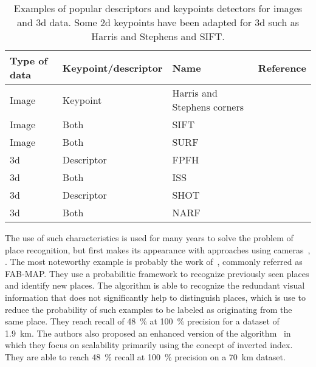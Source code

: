 \begin{table}[H]
    \centering
    \begin{tabular}{@{}llll@{}}
        \toprule
        \textbf{Type of data}  & \textbf{Keypoint/descriptor} & \textbf{Name}               & \textbf{Reference} \\
        \hline
        Image                  & Keypoint                     & Harris and Stephens corners & \cite{Harris1988}  \\
        Image                  & Both                         & SIFT                        & \cite{Lowe2004}    \\
        Image                  & Both                         & SURF                        & \cite{Bay2006}     \\
        \gls*{3d}              & Descriptor                   & FPFH                        & \cite{Rusu2009}    \\
        \gls*{3d}              & Both                         & ISS                         & \cite{Yu2009}      \\
        \gls*{3d}              & Descriptor                   & SHOT                        & \cite{Tombari2010} \\
        \gls*{3d}              & Both                         & NARF                        & \cite{Steder2011a} \\
        \bottomrule
    \end{tabular}
    \caption[Examples of popular descriptors and keypoints detectors for images and \gls*{3d} data.]{Examples of popular descriptors and keypoints detectors for images and \gls*{3d} data. Some \gls*{2d} keypoints have been adapted for \gls*{3d} such as Harris and Stephens and SIFT.}
    \label{tab:features_examples}
\end{table}

The use of such characteristics is used for many years to solve the problem of place recognition, but first makes its appearance with approaches using cameras~\citep{Torralba2003}, \cite{Ulrich2000}. The most noteworthy example is probably the work of~\citet{Cummins2008}, commonly referred as FAB-MAP. They use a probabilitic framework to recognize previously seen places and identify new places. The algorithm is able to recognize the redundant visual information that does not significantly help to distinguish places, which is use to reduce the probability of such examples to be labeled as originating from the same place. They reach recall of \SI{48}{\percent} at \SI{100}{\percent} precision for a dataset of \SI{1.9}{\kilo\meter}. The authors also proposed an enhanced version of the algorithm~\cite{Cummins2011} in which they focus on scalability primarily using the concept of inverted index. They are able to reach \SI{48}{\percent} recall at \SI{100}{\percent} precision on a \SI{70}{\kilo\meter} dataset.

